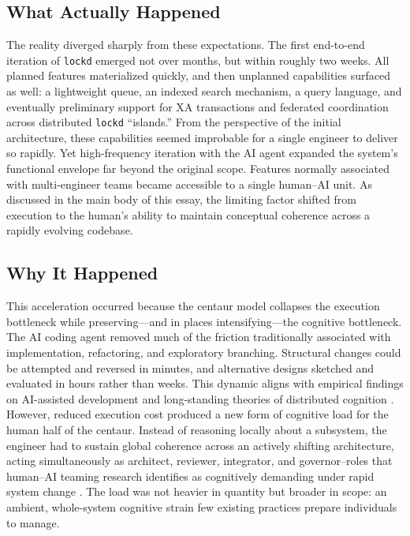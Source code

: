 \documentclass[11pt, a4paper, twocolumn]{article} %
\begin{document}
\subsection*{What Actually Happened}

The reality diverged sharply from these expectations. The first end-to-end iteration of \texttt{lockd} emerged not over months, but within roughly two weeks. All planned features materialized quickly, and then unplanned capabilities surfaced as well: a lightweight queue, an indexed search mechanism, a query language, and eventually preliminary support for XA transactions and federated coordination across distributed \texttt{lockd} ``islands.'' From the perspective of the initial architecture, these capabilities seemed improbable for a single engineer to deliver so rapidly. Yet high-frequency iteration with the AI agent expanded the system’s functional envelope far beyond the original scope. Features normally associated with multi-engineer teams became accessible to a single human–AI unit. As discussed in the main body of this essay, the limiting factor shifted from execution to the human’s ability to maintain conceptual coherence across a rapidly evolving codebase.

\subsection*{Why It Happened}

This acceleration occurred because the centaur model collapses the execution bottleneck while preserving---and in places intensifying---the cognitive bottleneck. The AI coding agent removed much of the friction traditionally associated with implementation, refactoring, and exploratory branching. Structural changes could be attempted and reversed in minutes, and alternative designs sketched and evaluated in hours rather than weeks. This dynamic aligns with empirical findings on AI-assisted development \citep{ercin2025} and long-standing theories of distributed cognition \citep{hutchins1995}. However, reduced execution cost produced a new form of cognitive load for the human half of the centaur. Instead of reasoning locally about a subsystem, the engineer had to sustain global coherence across an actively shifting architecture, acting simultaneously as architect, reviewer, integrator, and governor--roles that human–AI teaming research identifies as cognitively demanding under rapid system change \citep{seeber2020machines, schmutz2024aiteaming}. The load was not heavier in quantity but broader in scope: an ambient, whole-system cognitive strain few existing practices prepare individuals to manage.
\end{document}
